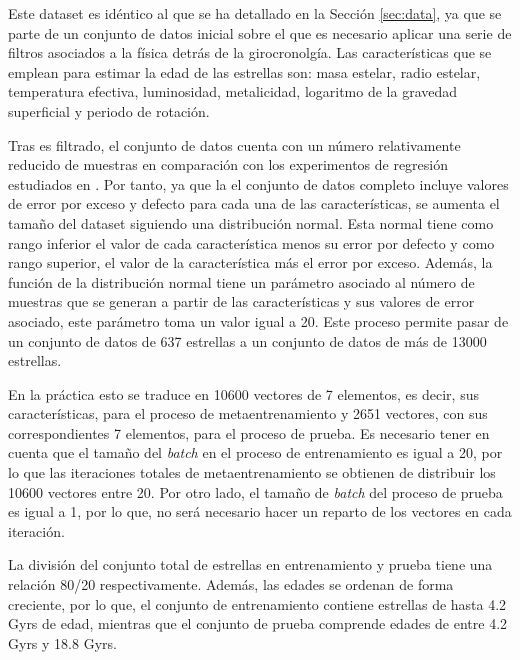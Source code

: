 Este dataset es idéntico al que se ha detallado en la Sección \ref{sec:data}, ya que se parte de un conjunto de datos inicial sobre el que es necesario aplicar una serie de filtros asociados a la física detrás de la girocronolgía. Las características que se emplean para estimar la edad de las estrellas son: masa estelar, radio estelar, temperatura efectiva, luminosidad, metalicidad, logaritmo de la gravedad superficial y periodo de rotación.

Tras es filtrado, el conjunto de datos cuenta con un número relativamente reducido de muestras en comparación con los experimentos de regresión estudiados en \cite{finn2017modelagnostic}. Por tanto, ya que la el conjunto de datos completo incluye valores de error por exceso y defecto para cada una de las características, se aumenta el tamaño del dataset siguiendo una distribución normal. Esta normal tiene como rango inferior el valor de cada característica menos su error por defecto y como rango superior, el valor de la característica más el error por exceso. Además, la función de la distribución normal tiene un parámetro asociado al número de muestras que se generan a partir de las características y sus valores de error asociado, este parámetro toma un valor igual a 20. Este proceso permite pasar de un conjunto de datos de 637 estrellas a un conjunto de datos de más de 13000 estrellas.

En la práctica esto se traduce en 10600 vectores de 7 elementos, es decir, sus características, para el proceso de metaentrenamiento y 2651 vectores, con sus correspondientes 7 elementos, para el proceso de prueba. Es necesario tener en cuenta que el tamaño del \emph{batch} en el proceso de entrenamiento es igual a 20, por lo que las iteraciones totales de metaentrenamiento se obtienen de distribuir los 10600 vectores entre 20. Por otro lado, el tamaño de \emph{batch} del proceso de prueba es igual a 1, por lo que, no será necesario hacer un reparto de los vectores en cada iteración. %

La división del conjunto total de estrellas en entrenamiento y prueba tiene una relación 80/20 respectivamente. Además, las edades se ordenan de forma creciente, por lo que, el conjunto de entrenamiento contiene estrellas de hasta 4.2 Gyrs de edad, mientras que el conjunto de prueba comprende edades de entre 4.2 Gyrs y 18.8 Gyrs.

